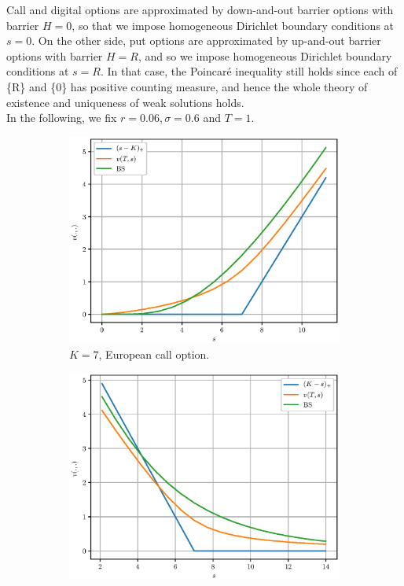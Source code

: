 Call and digital options are approximated by down-and-out barrier options with barrier $H=0$, so that we impose homogeneous Dirichlet boundary conditions at $s=0$. On the other side, put options are approximated by up-and-out barrier options with barrier $H=R$, and so we impose homogeneous Dirichlet boundary conditions at $s=R$. In that case, the Poincar\'{e} inequality still holds since each of \{R\} and \{0\} has positive counting measure, and hence the whole theory of existence and uniqueness of weak solutions holds.\\ In the following, we fix $r=0.06, \sigma=0.6$ and $T=1$.

\begin{figure}[h]
\centering
\begin{subfigure}{0.5\textwidth}
  \centering
  \includegraphics[width=1\linewidth]{figures/pricing/call_modi.eps}
  \caption{$K=7$, European call option.}
  \label{fig:sub1}
\end{subfigure}%
\begin{subfigure}{0.5\textwidth}
  \centering
  \includegraphics[width=\linewidth]{figures/pricing/put_modi.eps}

\end{subfigure}
\end{figure}
